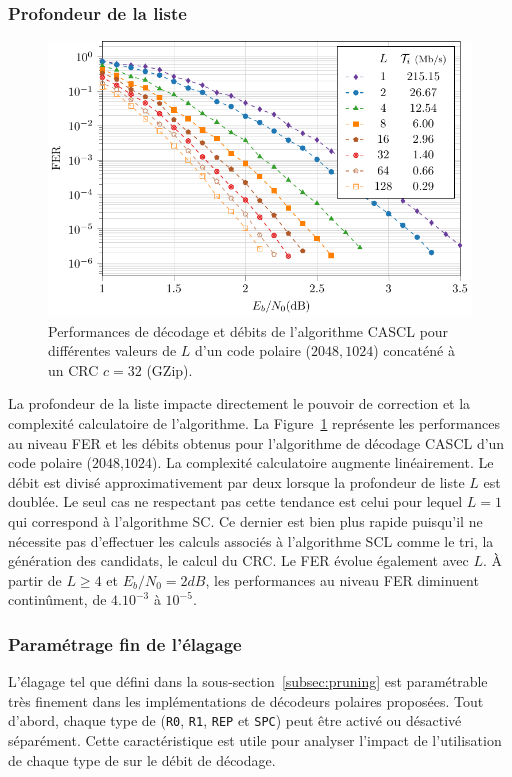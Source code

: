 \subsubsection{Profondeur de la liste}
\begin{figure}[t]
\includegraphics[width=\textwidth]{main/ch2_fig/curves/L/tikz/L}
\caption{Performances de décodage et débits de l'algorithme CASCL pour différentes valeurs de $L$ d'un code polaire ($2048,1024$) concaténé à un CRC $c=32$ (GZip).}
\label{fig:scl_l_thr}
\end{figure}
La profondeur de la liste impacte directement le pouvoir de correction et la complexité calculatoire de l'algorithme. La Figure~\ref{fig:scl_l_thr} représente les performances au niveau FER et les débits obtenus pour l'algorithme de décodage CASCL d'un code polaire ($2048$,$1024$). La complexité calculatoire augmente linéairement. Le débit est divisé approximativement par deux lorsque la profondeur de liste $L$ est doublée. Le seul cas ne respectant pas cette tendance est celui pour lequel $L=1$ qui correspond à l'algorithme SC. Ce dernier est bien plus rapide puisqu'il ne nécessite pas d'effectuer les calculs associés à l'algorithme SCL comme le tri, la génération des candidats, le calcul du CRC. Le FER évolue également avec $L$. \`A partir de $L\geq4$ et $E_b/N_0=2dB$, les performances au niveau FER diminuent continûment, de $4.10^{-3}$ à $10^{-5}$.

\subsubsection{Paramétrage fin de l'élagage}
L'élagage tel que défini dans la sous-section~\ref{subsec:pruning} est paramétrable très finement dans les implémentations de décodeurs polaires proposées. Tout d'abord, chaque type de \noeud (\texttt{R0}, \texttt{R1}, \texttt{REP} et \texttt{SPC}) peut être activé ou désactivé séparément. Cette caractéristique est utile pour analyser l'impact de l'utilisation de chaque type de \noeud sur le débit de décodage.

